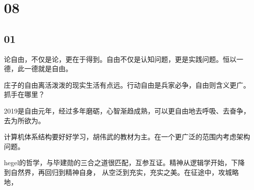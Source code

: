 \section{08}

\subsection{01}

论自由，不仅是论，更在于得到。自由不仅是认知问题，更是实践问题。恒以一德，此一德就是自由。

庄子的自由离活泼泼的现实生活有点远。行动自由是兵家必争，自由则含义更广。抓手在哪里？

2019是自由元年，经过多年磨砺，心智渐趋成熟，可以更自由地去呼吸、去奋争，去为所欲为。

\hrulefill

计算机体系结构要好好学习，胡伟武的教材为主。在一个更广泛的范围内考虑架构问题。

hegel的哲学，与毕建勋的三合之道很匹配，互参互证。精神从逻辑学开始，下降到自然界，再回归到精神自身，
从空泛到充实，充实之美。在征途中，攻城略地，

